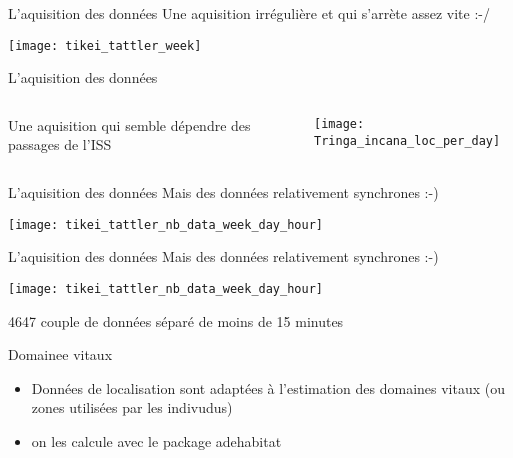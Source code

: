 \documentclass[10pt,compress]{beamer}
\begin{document}
\begin{frame}{L'aquisition des données}
  Une aquisition irrégulière et qui s'arrète assez vite :-/
  \begin{center}
    \texttt{[image: tikei\_tattler\_week]}    
  \end{center}
\end{frame}


\begin{frame}{L'aquisition des données}
  \begin{columns}
    \begin{column}[c]{0.4\textwidth}
      Une aquisition qui semble dépendre des passages de l'ISS
    \end{column}
    \begin{column}[c]{0.6\textwidth}
      \begin{center}
        \texttt{[image: Tringa\_incana\_loc\_per\_day]}
      \end{center}
    \end{column}
  \end{columns}
\end{frame}


\begin{frame}{L'aquisition des données}
  Mais des données relativement synchrones :-)\\
  \begin{center}
    \texttt{[image: tikei\_tattler\_nb\_data\_week\_day\_hour]}
  \end{center}
\end{frame}

\begin{frame}{L'aquisition des données}
  Mais des données relativement synchrones :-)\\
  \begin{center}
    \texttt{[image: tikei\_tattler\_nb\_data\_week\_day\_hour]}
  \end{center}
    {\footnotesize 4647 couple de données séparé de moins de 15 minutes}
\end{frame}


\begin{frame} {Domainee vitaux}
  \begin{itemize}
  \item Données de localisation sont adaptées à l'estimation des
    domaines vitaux (ou zones utilisées par les indivudus) {\tiny \cite{Kie2010}}
  \item on les calcule avec le package adehabitat {\tiny \cite{Calenge2015,Calenge2006} }
  \end{itemize}
\end{frame}
\end{document}
